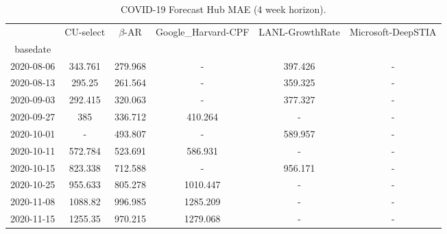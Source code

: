     
\begin{table*}[t]
\small
\caption{COVID-19 Forecast Hub MAE (4 week horizon).\label{tab:reichalb_eval_4} }

\centering
    
\begin{tabular}{cccccc}
\toprule
{} &                       CU-select &                      $\beta$-AR & Google\_Harvard-CPF & LANL-GrowthRate &              Microsoft-DeepSTIA \\
basedate   &                                 &                                 &                     &                 &                                 \\
\midrule
2020-08-06 &                         343.761 &   {\cellcolor{blue!25} 279.968} &                   - &         397.426 &                               - \\
2020-08-13 &                          295.25 &   {\cellcolor{blue!25} 261.564} &                   - &         359.325 &                               - \\
2020-09-03 &   {\cellcolor{blue!25} 292.415} &                         320.063 &                   - &         377.327 &                               - \\
2020-09-27 &                             385 &   {\cellcolor{blue!25} 336.712} &             410.264 &               - &                               - \\
2020-10-01 &                               - &   {\cellcolor{blue!25} 493.807} &                   - &         589.957 &                               - \\
2020-10-11 &                         572.784 &   {\cellcolor{blue!25} 523.691} &             586.931 &               - &                               - \\
2020-10-15 &                         823.338 &   {\cellcolor{blue!25} 712.588} &                   - &         956.171 &                               - \\
2020-10-25 &                         955.633 &   {\cellcolor{blue!25} 805.278} &            1010.447 &               - &                               - \\
2020-11-08 &                         1088.82 &   {\cellcolor{blue!25} 996.985} &            1285.209 &               - &                               - \\
2020-11-15 &                         1255.35 &   {\cellcolor{blue!25} 970.215} &            1279.068 &               - &                               - \\

\end{tabular}
\end{table*}
